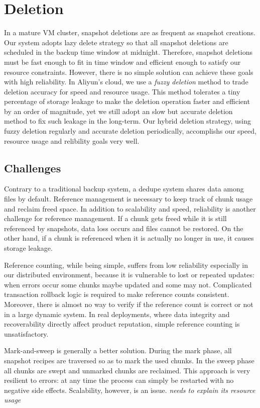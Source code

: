 \section{Deletion}
In a mature VM cluster, snapshot deletions are as frequent as snapshot creations.
Our system adopts lazy delete strategy so that all snapshot deletions are scheduled
in the backup time window at midnight. 
Therefore, snapshot deletions must be fast enough to fit in time window and
efficient enough to satisfy our resource constraints.
However, there is no simple solution can achieve these goals with high reliability.
In Aliyun's cloud, we use a {\em fuzzy deletion} method to trade deletion accuracy for
speed and resource usage. This method tolerates a tiny percentage of storage leakage
to make the deletion operation faster and efficient by an order of magnitude,
yet we still adopt an slow but accurate deletion method to fix such leakage in the long-term.
Our hybrid deletion strategy, using fuzzy deletion regularly and accurate deletion periodically,
accomplishs our speed, resource usage and relibility goals very well.

\subsection{Challenges}
Contrary to a traditional backup system, a dedupe system shares data among files by default. 
Reference management is necessary to keep track of chunk usage and reclaim freed space. 
In addition to scalability and speed, reliability is another challenge for reference management. 
If a chunk gets freed while it is still referenced by snapshots, data loss occurs and files cannot be restored. 
On the other hand, if a chunk is referenced when it is actually no longer in use, it causes storage leakage.

Reference counting, while being simple, suffers from low reliability especially in our distributed environment, 
because it is vulnerable to lost or repeated updates: when errors occur some chunks maybe updated and some may not. 
Complicated transaction rollback logic is required to make reference counts consistent. Moreover, 
there is almost no way to verify if the reference count is correct or not in a large dynamic system. 
In real deployments, where data integrity and recoverability directly affect product reputation, simple reference counting is unsatisfactory.

Mark-and-sweep is generally a better solution. During the mark phase, all snapshot recipes are traversed so as to mark the used chunks. 
In the sweep phase all chunks are swept and unmarked chunks are reclaimed. 
This approach is very resilient to errors: at any time the process can simply be restarted with no negative side effects. 
Scalability, however, is an issue. {\em needs to explain its resource usage}

